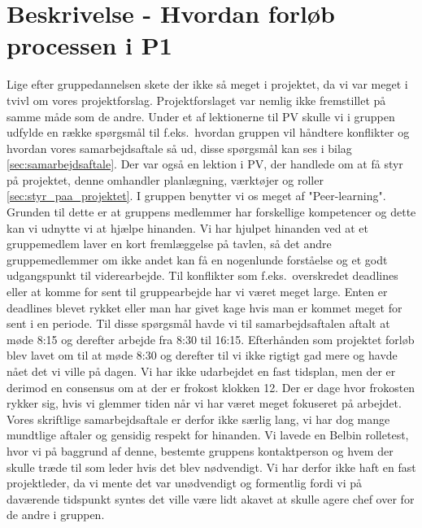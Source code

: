 \documentclass[oneside,a4paper,titlepage]{article}
\begin{document}
\section{Beskrivelse - Hvordan forløb processen i P1}

Lige efter gruppedannelsen skete der ikke så meget i projektet, da vi var meget i tvivl om vores projektforslag. Projektforslaget var nemlig ikke fremstillet på samme måde som de andre. Under et af lektionerne til PV skulle vi i gruppen udfylde en række spørgsmål til f.eks.\ hvordan gruppen vil håndtere konflikter og hvordan vores samarbejdsaftale så ud, disse spørgsmål kan ses i bilag \ref{sec:samarbejdsaftale}. Der var også en lektion i PV, der handlede om at få styr på projektet, denne omhandler planlægning, værktøjer og roller \ref{sec:styr_paa_projektet}.\newline\newline
I gruppen benytter vi os meget af "Peer-learning". Grunden til dette er at gruppens medlemmer har forskellige kompetencer og dette kan vi udnytte vi at hjælpe hinanden. Vi har hjulpet hinanden ved at et gruppemedlem laver en kort fremlæggelse på tavlen, så det andre gruppemedlemmer om ikke andet kan få en nogenlunde forståelse og et godt udgangspunkt til viderearbejde.
Til konflikter som f.eks.\ overskredet deadlines eller at komme for sent til gruppearbejde har vi været meget large. Enten er deadlines blevet rykket eller man har givet kage hvis man er kommet meget for sent i en periode. \newline\newline
Til disse spørgsmål havde vi til samarbejdsaftalen aftalt at møde 8:15 og derefter arbejde fra 8:30 til 16:15. Efterhånden som projektet forløb blev lavet om til at møde 8:30 og derefter til vi ikke rigtigt gad mere og havde nået det vi ville på dagen. Vi har ikke udarbejdet en fast tidsplan, men der er derimod en consensus om at der er frokost klokken 12. Der er dage hvor frokosten rykker sig, hvis vi glemmer tiden når vi har været meget fokuseret på arbejdet. Vores skriftlige samarbejdsaftale er derfor ikke særlig lang, vi har dog mange mundtlige aftaler og gensidig respekt for hinanden. \newline\newline
Vi lavede en Belbin rolletest, hvor vi på baggrund af denne, bestemte gruppens kontaktperson og hvem der skulle træde til som leder hvis det blev nødvendigt. Vi har derfor ikke haft en fast projektleder, da vi mente det var unødvendigt og formentlig fordi vi på daværende tidspunkt syntes det ville være lidt akavet at skulle agere chef over for de andre i gruppen.\newline\newline
\end{document}
